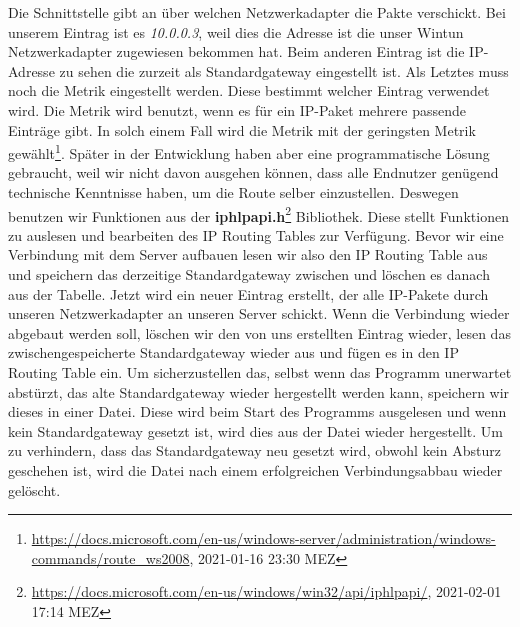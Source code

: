 Die Schnittstelle gibt an über welchen Netzwerkadapter die Pakte verschickt. Bei unserem Eintrag ist es \textit{10.0.0.3}, weil dies die Adresse ist die unser Wintun Netzwerkadapter zugewiesen bekommen hat. Beim anderen Eintrag ist die IP-Adresse zu sehen die zurzeit als Standardgateway eingestellt ist. 
\newline
\newline
Als Letztes muss noch die Metrik eingestellt werden. Diese bestimmt welcher Eintrag verwendet wird. Die Metrik wird benutzt, wenn es für ein IP-Paket mehrere passende Einträge gibt. In solch einem Fall wird die Metrik mit der geringsten Metrik gewählt\footnote[2]{\url{https://docs.microsoft.com/en-us/windows-server/administration/windows-commands/route_ws2008}, 2021-01-16 23:30 MEZ}.
\newpage
Später in der Entwicklung haben aber eine programmatische Lösung gebraucht, weil wir nicht davon ausgehen können, dass alle Endnutzer genügend technische Kenntnisse haben, um die Route selber einzustellen. Deswegen benutzen wir Funktionen aus der \textbf{iphlpapi.h}\footnote[1]{\url{https://docs.microsoft.com/en-us/windows/win32/api/iphlpapi/}, 2021-02-01 17:14 MEZ} Bibliothek. Diese stellt Funktionen zu auslesen und bearbeiten des IP Routing Tables zur Verfügung.
\newline
\newline
Bevor wir eine Verbindung mit dem Server aufbauen lesen wir also den IP Routing Table aus und speichern das derzeitige Standardgateway zwischen und löschen es danach aus der Tabelle. Jetzt wird ein neuer Eintrag erstellt, der alle IP-Pakete durch unseren Netzwerkadapter an unseren Server schickt.
\newline
\newline
Wenn die Verbindung wieder abgebaut werden soll, löschen wir den von uns erstellten Eintrag wieder, lesen das zwischengespeicherte Standardgateway wieder aus und fügen es in den IP Routing Table ein.
\newline
\newline
Um sicherzustellen das, selbst wenn das Programm unerwartet abstürzt, das alte Standardgateway wieder hergestellt werden kann, speichern wir dieses in einer Datei. Diese wird beim Start des Programms ausgelesen und wenn kein Standardgateway gesetzt ist, wird dies aus der Datei wieder hergestellt. Um zu verhindern, dass das Standardgateway neu gesetzt wird, obwohl kein Absturz geschehen ist, wird die Datei nach einem erfolgreichen Verbindungsabbau wieder gelöscht.
